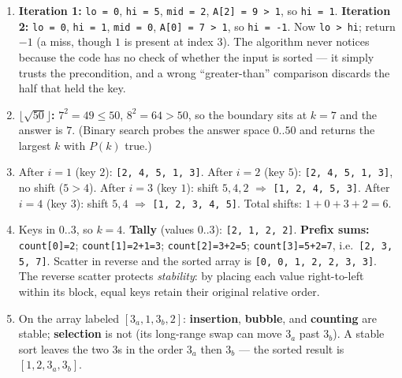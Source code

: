 \documentclass[11pt]{article}
\begin{document}
\begingroup\small
\begin{enumerate}
  \item \textbf{Iteration 1:} \texttt{lo = 0}, \texttt{hi = 5}, \texttt{mid = 2}, \texttt{A[2] = 9 > 1}, so \texttt{hi = 1}. \textbf{Iteration 2:} \texttt{lo = 0}, \texttt{hi = 1}, \texttt{mid = 0}, \texttt{A[0] = 7 > 1}, so \texttt{hi = -1}. Now \texttt{lo > hi}; return $-1$ (a miss, though $1$ is present at index $3$). The algorithm never notices because the code has no check of whether the input is sorted --- it simply trusts the precondition, and a wrong ``greater-than'' comparison discards the half that held the key.
  \item \textbf{$\lfloor \sqrt{50} \rfloor$:} $7^2 = 49 \le 50$, $8^2 = 64 > 50$, so the boundary sits at $k = 7$ and the answer is $7$. (Binary search probes the answer space $0..50$ and returns the largest $k$ with $P(k)$ true.)
  \item After $i=1$ (key $2$): \texttt{[2, 4, 5, 1, 3]}. After $i=2$ (key $5$): \texttt{[2, 4, 5, 1, 3]}, no shift ($5 > 4$). After $i=3$ (key $1$): shift $5,4,2$ $\Rightarrow$ \texttt{[1, 2, 4, 5, 3]}. After $i=4$ (key $3$): shift $5,4$ $\Rightarrow$ \texttt{[1, 2, 3, 4, 5]}. Total shifts: $1 + 0 + 3 + 2 = 6$.
  \item Keys in $0..3$, so $k = 4$. \textbf{Tally} (values $0..3$): \texttt{[2, 1, 2, 2]}. \textbf{Prefix sums:} \texttt{count[0]=2}; \texttt{count[1]=2+1=3}; \texttt{count[2]=3+2=5}; \texttt{count[3]=5+2=7}, i.e.\ \texttt{[2, 3, 5, 7]}. Scatter in reverse and the sorted array is \texttt{[0, 0, 1, 2, 2, 3, 3]}. The reverse scatter protects \emph{stability}: by placing each value right-to-left within its block, equal keys retain their original relative order.
  \item On the array labeled $[3_a, 1, 3_b, 2]$: \textbf{insertion}, \textbf{bubble}, and \textbf{counting} are stable; \textbf{selection} is not (its long-range swap can move $3_a$ past $3_b$). A stable sort leaves the two $3$s in the order $3_a$ then $3_b$ --- the sorted result is $[1, 2, 3_a, 3_b]$.
\end{enumerate}
\endgroup



\end{document}
